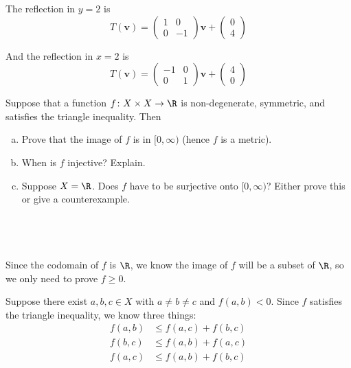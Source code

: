 \documentclass[a4paper]{article}
\begin{document}
The reflection in $y=2$ is \[ T(\mathbf v) = \begin{pmatrix} 1 & 0 \\ 0 & -1 \end{pmatrix} \mathbf v + \begin{pmatrix} 0 \\ 4 \end{pmatrix} \]

And the reflection in $x=2$ is \[ T(\mathbf v) = \begin{pmatrix} -1 & 0 \\ 0 & 1 \end{pmatrix} \mathbf v + \begin{pmatrix} 4 \\ 0 \end{pmatrix} \]



\begin{questionbody}
Suppose that a function $f \colon X \times X \to \R$ is non-degenerate, symmetric, and satisfies the triangle inequality. Then \begin{enumerate}[(a)]
\item Prove that the image of $f$ is in $[0, \infty)$ (hence $f$ is a metric). %
\item When is $f$ injective? Explain.
\item Suppose $X = \R$. Does $f$ have to be surjective onto $[0, \infty)$? Either prove this or give a counterexample. %
\end{enumerate}
\end{questionbody}

\subsection{~} %

Since the codomain of $f$ is $\R$, we know the image of $f$ will be a subset of $\R$, so we only need to prove $f \ge 0$.

Suppose there exist $a, b, c \in X$ with $a \ne b \ne c$ and $f(a, b) < 0$. Since $f$ satisfies the triangle inequality, we know three things: \begin{align*}
f(a, b) &\le f(a, c) + f(b, c) \\
f(b, c) &\le f(a, b) + f(a, c) \\
f(a, c) &\le f(a, b) + f(b, c)
\end{align*}
\end{document}
